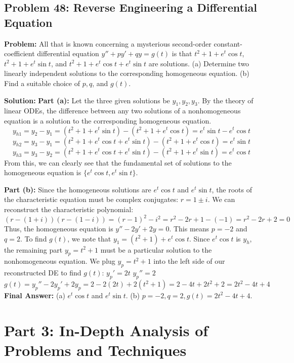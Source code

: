 \documentclass[12pt]{article}
\begin{document}
\subsection{Problem 48: Reverse Engineering a Differential Equation}
\textbf{Problem:} All that is known concerning a mysterious second-order constant-coefficient differential equation $y'' + py' + qy = g(t)$ is that $t^2 + 1 + e^t \cos t$, $t^2 + 1 + e^t \sin t$, and $t^2 + 1 + e^t \cos t + e^t \sin t$ are solutions.
(a) Determine two linearly independent solutions to the corresponding homogeneous equation.
(b) Find a suitable choice of $p, q$, and $g(t)$.

\textbf{Solution:}
\textbf{Part (a):}
Let the three given solutions be $y_1, y_2, y_3$. By the theory of linear ODEs, the difference between any two solutions of a nonhomogeneous equation is a solution to the corresponding homogeneous equation.
\[ y_{h1} = y_2 - y_1 = (t^2 + 1 + e^t \sin t) - (t^2 + 1 + e^t \cos t) = e^t \sin t - e^t \cos t \]
\[ y_{h2} = y_3 - y_1 = (t^2 + 1 + e^t \cos t + e^t \sin t) - (t^2 + 1 + e^t \cos t) = e^t \sin t \]
\[ y_{h3} = y_3 - y_2 = (t^2 + 1 + e^t \cos t + e^t \sin t) - (t^2 + 1 + e^t \sin t) = e^t \cos t \]
From this, we can clearly see that the fundamental set of solutions to the homogeneous equation is $\{e^t \cos t, e^t \sin t\}$.

\textbf{Part (b):}
Since the homogeneous solutions are $e^t \cos t$ and $e^t \sin t$, the roots of the characteristic equation must be complex conjugates: $r = 1 \pm i$.
We can reconstruct the characteristic polynomial:
\[ (r - (1 + i))(r - (1 - i)) = (r - 1)^2 - i^2 = r^2 - 2r + 1 - (-1) = r^2 - 2r + 2 = 0 \]
Thus, the homogeneous equation is $y'' - 2y' + 2y = 0$. This means $p = -2$ and $q = 2$.
To find $g(t)$, we note that $y_1 = (t^2 + 1) + e^t \cos t$. Since $e^t \cos t$ is $y_h$, the remaining part $y_p = t^2 + 1$ must be a particular solution to the nonhomogeneous equation.
We plug $y_p = t^2 + 1$ into the left side of our reconstructed DE to find $g(t)$:
$y_p' = 2t$
$y_p'' = 2$
\[ g(t) = y_p'' - 2y_p' + 2y_p = 2 - 2(2t) + 2(t^2 + 1) = 2 - 4t + 2t^2 + 2 = 2t^2 - 4t + 4 \]
\textbf{Final Answer:} (a) $e^t \cos t$ and $e^t \sin t$. (b) $p = -2, q = 2, g(t) = 2t^2 - 4t + 4$.

\newpage
\section{Part 3: In-Depth Analysis of Problems and Techniques}
\end{document}
